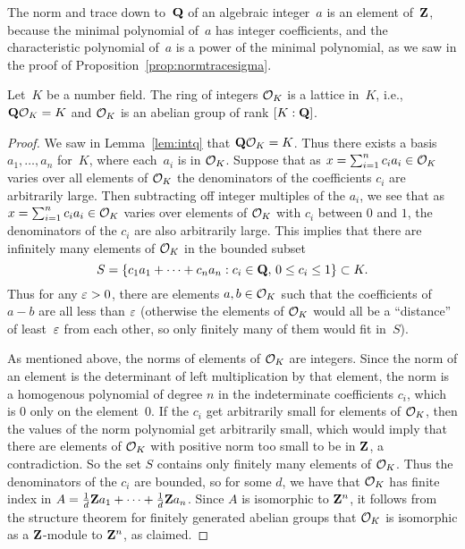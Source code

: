 The norm and trace down to~$\mathbf{Q}$ of an algebraic integer~$a$ is an
element of~$\mathbf{Z}$, because the minimal polynomial of~$a$ has integer
coefficients, and the characteristic polynomial of~$a$ is a power of the
minimal polynomial, as we saw in the proof of
Proposition~\ref{prop:normtracesigma}.

\begin{proposition}\label{prop:ok_lattice}
Let~$K$ be a number field.  The ring of integers $\mathcal{O}_K$ is a lattice
in~$K$, i.e., $\mathbf{Q}\mathcal{O}_K=K$ and $\mathcal{O}_K$ is an abelian group of rank $[K:\mathbf{Q}]$.
\end{proposition}
\begin{proof}
We saw in Lemma~\ref{lem:intq} that $\mathbf{Q}\mathcal{O}_K=K$.  Thus there exists a
basis $a_1,\ldots, a_n$ for~$K$, where each~$a_i$ is in $\mathcal{O}_K$.
Suppose that as $x=\sum_{i=1}^n c_i a_i\in \mathcal{O}_K$ varies over all elements of
$\mathcal{O}_K$ the denominators of the coefficients $c_i$ are arbitrarily
large.  Then subtracting off integer multiples of the $a_i$, we see
that as $x=\sum_{i=1}^n c_i a_i\in \mathcal{O}_K$ varies over elements of $\mathcal{O}_K$ with
$c_i$ between $0$ and $1$, the denominators of the $c_i$ are also
arbitrarily large.  This implies that there are infinitely many elements
of $\mathcal{O}_K$ in the bounded subset
$$S = \left\{c_1 a_1 +\cdots + c_n a_n : c_i \in \mathbf{Q},\, 0\leq c_i \leq 1\right\}\subset K.$$
Thus for any $\varepsilon>0$, there are elements $a,b\in \mathcal{O}_K$ such that the
coefficients of $a-b$ are all less than $\varepsilon$ (otherwise the elements
of $\mathcal{O}_K$ would all be a ``distance'' 
of least~$\varepsilon$ from each other, so only finitely
many of them would fit in~$S$).

As mentioned above, the norms of elements of $\mathcal{O}_K$ are integers.
Since the norm of an element is the determinant of left multiplication
by that element, the norm is a homogenous polynomial of degree $n$ in
the indeterminate coefficients $c_i$, which is $0$ only on the
element~$0$.  If the $c_i$ get arbitrarily small for elements of
$\mathcal{O}_K$, then the values of the norm polynomial get arbitrarily small,
which would imply that there are elements of $\mathcal{O}_K$ with positive norm
too small to be in $\mathbf{Z}$, a contradiction.  So the set $S$ contains
only finitely many elements of $\mathcal{O}_K$.  Thus the denominators of the
$c_i$ are bounded, so for some $d$, we have that $\mathcal{O}_K$ has finite
index in $A=\frac{1}{d}\mathbf{Z} a_1 + \cdots + \frac{1}{d}\mathbf{Z} a_n$.  Since
$A$ is isomorphic to $\mathbf{Z}^n$, it follows from the structure theorem for
finitely generated abelian groups that $\mathcal{O}_K$ is isomorphic as a
$\mathbf{Z}$-module to $\mathbf{Z}^n$, as claimed.
\end{proof}

